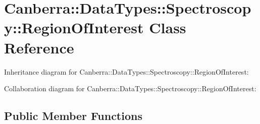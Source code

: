 \hypertarget{class_canberra_1_1_data_types_1_1_spectroscopy_1_1_region_of_interest}{}\section{Canberra\+:\+:Data\+Types\+:\+:Spectroscopy\+:\+:Region\+Of\+Interest Class Reference}
\label{class_canberra_1_1_data_types_1_1_spectroscopy_1_1_region_of_interest}


Inheritance diagram for Canberra\+:\+:Data\+Types\+:\+:Spectroscopy\+:\+:Region\+Of\+Interest\+:


Collaboration diagram for Canberra\+:\+:Data\+Types\+:\+:Spectroscopy\+:\+:Region\+Of\+Interest\+:
\subsection*{Public Member Functions}
